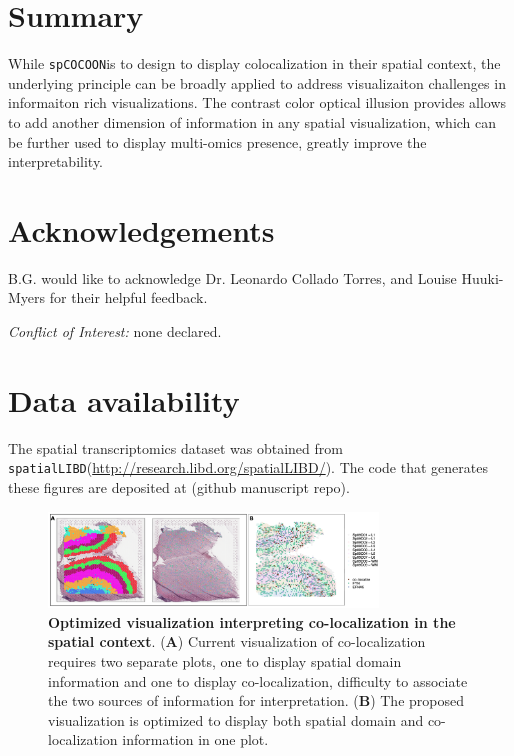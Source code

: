 \documentclass[11pt]{article}
\newcommand{\fixme}[1]{{\color{red} (#1)}}
\newcommand{\coloc}{\texttt{spCOCOON}}
\begin{document}
\section*{Summary}

While \coloc is to design to display colocalization in their spatial context, the underlying principle can be broadly applied to address visualizaiton challenges in informaiton rich visualizations. The contrast color optical illusion provides allows to add another dimension of information in any spatial visualization, which can be further used to display multi-omics presence, greatly improve the interpretability. 


\section*{Acknowledgements}
B.G. would like to acknowledge Dr. Leonardo Collado Torres,  and Louise Huuki-Myers for their helpful feedback.

\vspace{0.2in}
\noindent \textit{Conflict of Interest:} none declared.

\section*{Data availability}
The spatial transcriptomics dataset was obtained from \texttt{spatialLIBD}(\url{http://research.libd.org/spatialLIBD/}). The code that generates these figures are deposited at \fixme{github manuscript repo}.

\clearpage
\begin{figure}
\vspace{-0.3in}
\begin{center}
\includegraphics[width=0.78\textwidth]{figure/new_visiual.png}
\end{center}
\vspace{-0.35in}
\caption{\footnotesize \textbf{Optimized visualization interpreting co-localization in the spatial context}. (\textbf{A}) Current visualization of co-localization requires two separate plots, one to display spatial domain information and one to display co-localization, difficulty to associate the two sources of information for interpretation. (\textbf{B}) The proposed visualization is optimized to display both spatial domain and co-localization information in one plot.}
\label{fig:visual} 
\end{figure}


\clearpage 

\end{document}
